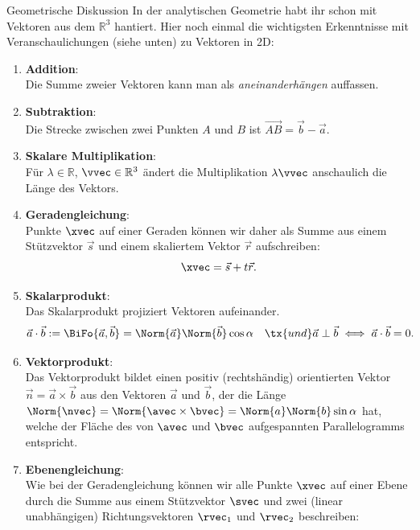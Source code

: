 \begin{Beispiel}
{Geometrische Diskussion}
In der analytischen Geometrie habt ihr schon mit Vektoren aus dem $\mathbb{R}^3$ hantiert. Hier noch einmal die wichtigsten Erkenntnisse mit Veranschaulichungen (siehe unten) zu Vektoren in 2D:
\begin{enumerate}
    \item \textbf{Addition}:\\
    Die Summe zweier Vektoren kann man als \textit{aneinanderhängen} auffassen.
    \item \textbf{Subtraktion}:\\
    Die Strecke zwischen zwei Punkten $A$ und $B$ ist $\Vec{AB}=\Vec{b}-\Vec{a}$.
    \item \textbf{Skalare Multiplikation}:\\
    Für $\lambda\in\mathbb{R}$, $\vvec\in\mathbb{R}^3$ ändert die Multiplikation $\lambda\vvec$ anschaulich die Länge des Vektors.
    \item \textbf{Geradengleichung}:\\
    Punkte $\xvec$ auf einer Geraden können wir daher als Summe aus einem Stützvektor $\Vec{s}$ und einem skaliertem Vektor $\Vec{r}$ aufschreiben:
    \begin{equation*}
        \xvec=\Vec{s}+t\Vec{r}.
    \end{equation*}
    \item \textbf{Skalarprodukt}:\\
    Das Skalarprodukt projiziert Vektoren aufeinander.
    \begin{equation*}
    \Vec{a}\cdot\Vec{b}:=\BiFo{\Vec{a},\Vec{b}}=\Norm{\Vec{a}}\Norm{\Vec{b}}\cos\alpha\quad\tx{und }\Vec{a}\perp\Vec{b}\iff \Vec{a}\cdot\Vec{b}=0.
    \end{equation*}
    \item \textbf{Vektorprodukt}:\\
    Das Vektorprodukt bildet einen positiv (rechtshändig) orientierten Vektor $\Vec{n}=\Vec{a}\times \Vec{b}$ aus den Vektoren $\Vec{a}$ und $\Vec{b}$, der die Länge $\Norm{\nvec}=\Norm{\avec\times\bvec}=\Norm{a}\Norm{b}\sin\alpha$ hat, welche der Fläche des von $\avec$ und $\bvec$ aufgespannten Parallelogramms entspricht.
    \item \textbf{Ebenengleichung}:\\
    Wie bei der Geradengleichung können wir alle Punkte $\xvec$ auf einer Ebene durch die Summe aus einem Stützvektor $\svec$ und zwei (linear unabhängigen) Richtungsvektoren $\rvec_1$ und $\rvec_2$ beschreiben:

\end{enumerate}
\end{Beispiel}
